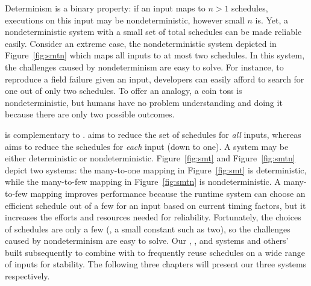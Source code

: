  Determinism
is a binary property: if an input maps to $n > 1$ schedules, executions on this
input may be nondeterministic, however small $n$ is.  Yet, a nondeterministic
system with a small set of total schedules can be made reliable easily. 
Consider an extreme case, the nondeterministic system depicted in
Figure~\ref{fig:smtn} which maps all inputs to at most two schedules.  In this
system, the challenges caused by nondeterminism are
easy to solve.  For instance, to reproduce a field failure given an input,
developers can easily afford to search for one out of only two schedules.
To offer an analogy, a coin toss is nondeterministic, but humans have
no problem understanding and doing it because there are only two possible
outcomes.

\dmt is complementary to \smt. \smt aims to reduce the set of schedules for
\emph{all} inputs, whereas \dmt aims to reduce the schedules for \emph{each}
input (down to one).  A \smt system may be either deterministic or
nondeterministic. Figure~\ref{fig:smt} and Figure~\ref{fig:smtn} depict two \smt
systems: the many-to-one mapping in Figure~\ref{fig:smt} is deterministic, while
the many-to-few mapping in Figure~\ref{fig:smtn} is nondeterministic.  A
many-to-few mapping improves performance because the runtime system can choose
an efficient schedule out of a few for an input based on current timing factors,
but it increases the efforts and resources needed for reliability.  Fortunately,
the choices of schedules are only a few (\eg, a small constant such as two), so
the challenges caused by nondeterminism are easy to solve. Our \tern,
\peregrine, and \parrot systems and others' \dthreads~\cite{dthreads:sosp11}
built subsequently to \tern combine \dmt with \smt to frequently reuse schedules
on a wide range of inputs for stability. The following three chapters will
present our three systems respectively.

